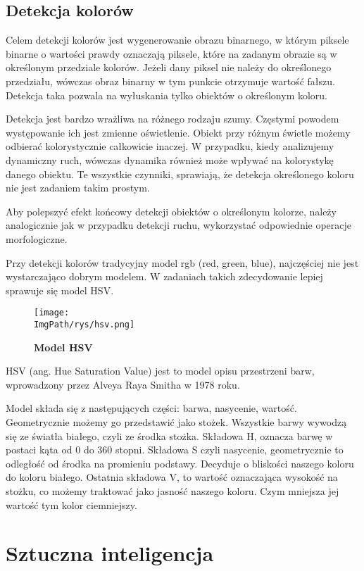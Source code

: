 \documentclass[a4paper,12pt,twoside,openany]{report}
\newcommand{\ImgPath}{.}
\begin{document}
\section{Detekcja kolorów}
Celem detekcji kolorów jest wygenerowanie obrazu binarnego, w którym piksele binarne  o wartości prawdy oznaczają piksele, które na zadanym obrazie są w określonym przedziale kolorów. Jeżeli dany piksel nie należy do określonego  przedziału, wówczas obraz binarny w tym punkcie otrzymuje wartość fałszu. Detekcja taka pozwala na wyłuskania tylko obiektów o określonym koloru.

Detekcja jest bardzo wrażliwa na różnego rodzaju szumy. Częstymi powodem występowanie ich jest zmienne oświetlenie. Obiekt przy różnym świetle możemy odbierać kolorystycznie całkowicie inaczej. W przypadku, kiedy analizujemy dynamiczny ruch, wówczas dynamika również może wpływać na kolorystykę danego obiektu. Te wszystkie czynniki, sprawiają, że detekcja określonego koloru nie jest zadaniem takim prostym. 

Aby polepszyć efekt końcowy detekcji obiektów o określonym kolorze, należy analogicznie jak w przypadku detekcji ruchu, wykorzystać odpowiednie operacje morfologiczne. 

Przy detekcji kolorów tradycyjny model rgb (red, green, blue), najczęściej nie jest wystarczająco dobrym modelem. W zadaniach takich zdecydowanie lepiej sprawuje się model HSV.

\begin{figure}[H]	
	\centering
	\texttt{[image: \\ImgPath/rys/hsv.png]}
	
	\caption{  \textbf{Model HSV}}
\end{figure}

HSV (ang. Hue Saturation Value) jest to model opisu przestrzeni barw, wprowadzony przez Alveya Raya Smitha w 1978 roku.

Model składa się z następujących części: barwa, nasycenie, wartość. Geometrycznie możemy go przedstawić jako stożek. Wszystkie barwy wywodzą się ze światła białego, czyli ze środka stożka. Składowa H, oznacza barwę w postaci kąta od 0 do 360 stopni. Składowa S czyli nasycenie, geometrycznie to odległość od środka na promieniu podstawy. Decyduje o bliskości naszego koloru do koloru białego. Ostatnia składowa V, to wartość oznaczająca wysokość na stożku, co możemy traktować jako jasność naszego koloru. Czym mniejsza jej wartość tym kolor ciemniejszy.

\chapter{Sztuczna inteligencja}
\end{document}
